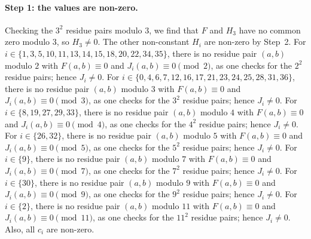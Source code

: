 \documentclass[11pt]{article}
\begin{document}
\paragraph{Step 1: the values are non-zero.} Checking the $3^2$ residue pairs modulo $3$, we find that $F$ and $H_{3}$ have no common zero modulo $3$, so $H_{3}\neq0$. The other non-constant $H_i$ are non-zero by Step~2. For $i\in\{1,\allowbreak 3,\allowbreak 5,\allowbreak 10,\allowbreak 11,\allowbreak 13,\allowbreak 14,\allowbreak 15,\allowbreak 18,\allowbreak 20,\allowbreak 22,\allowbreak 34,\allowbreak 35\}$, there is no residue pair $(a,b)$ modulo $2$ with $F(a,b)\equiv0$ and $J_i(a,b)\equiv0\pmod{2}$, as one checks for the $2^2$ residue pairs; hence $J_i\neq0$. For $i\in\{0,\allowbreak 4,\allowbreak 6,\allowbreak 7,\allowbreak 12,\allowbreak 16,\allowbreak 17,\allowbreak 21,\allowbreak 23,\allowbreak 24,\allowbreak 25,\allowbreak 28,\allowbreak 31,\allowbreak 36\}$, there is no residue pair $(a,b)$ modulo $3$ with $F(a,b)\equiv0$ and $J_i(a,b)\equiv0\pmod{3}$, as one checks for the $3^2$ residue pairs; hence $J_i\neq0$. For $i\in\{8,\allowbreak 19,\allowbreak 27,\allowbreak 29,\allowbreak 33\}$, there is no residue pair $(a,b)$ modulo $4$ with $F(a,b)\equiv0$ and $J_i(a,b)\equiv0\pmod{4}$, as one checks for the $4^2$ residue pairs; hence $J_i\neq0$. For $i\in\{26,\allowbreak 32\}$, there is no residue pair $(a,b)$ modulo $5$ with $F(a,b)\equiv0$ and $J_i(a,b)\equiv0\pmod{5}$, as one checks for the $5^2$ residue pairs; hence $J_i\neq0$. For $i\in\{9\}$, there is no residue pair $(a,b)$ modulo $7$ with $F(a,b)\equiv0$ and $J_i(a,b)\equiv0\pmod{7}$, as one checks for the $7^2$ residue pairs; hence $J_i\neq0$. For $i\in\{30\}$, there is no residue pair $(a,b)$ modulo $9$ with $F(a,b)\equiv0$ and $J_i(a,b)\equiv0\pmod{9}$, as one checks for the $9^2$ residue pairs; hence $J_i\neq0$. For $i\in\{2\}$, there is no residue pair $(a,b)$ modulo $11$ with $F(a,b)\equiv0$ and $J_i(a,b)\equiv0\pmod{11}$, as one checks for the $11^2$ residue pairs; hence $J_i\neq0$. Also, all $c_i$ are non-zero.
\end{document}
